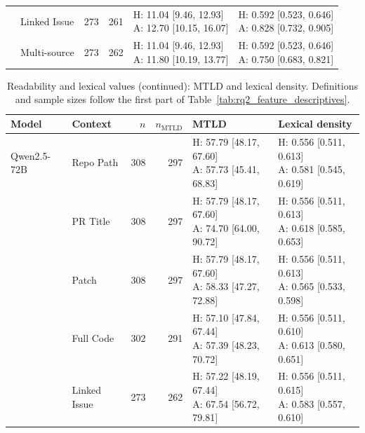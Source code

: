 \begin{table}[tbp]
\begin{tabular}{llrrll}
 & Linked Issue & 273 & 261 & \shortstack[l]{H: 11.04 [9.46, 12.93]\\A: 12.70 [10.15, 16.07]} & \shortstack[l]{H: 0.592 [0.523, 0.646]\\A: 0.828 [0.732, 0.905]} \\
 & Multi-source & 273 & 262 & \shortstack[l]{H: 11.04 [9.46, 12.93]\\A: 11.80 [10.19, 13.77]} & \shortstack[l]{H: 0.592 [0.523, 0.646]\\A: 0.750 [0.683, 0.821]} \\
\bottomrule
\end{tabular}
\end{table}

\begin{table}[tbp]
\ContinuedFloat
\caption[]{Readability and lexical values (continued): MTLD and lexical density. Definitions and sample sizes follow the first part of Table~\ref{tab:rq2_feature_descriptives}.}
\centering
\footnotesize
\setlength{\tabcolsep}{3pt}
\renewcommand{\arraystretch}{1.08}
\begin{tabular}{llrrll}
\toprule
\textbf{Model} & \textbf{Context} & \textbf{$n$} & \textbf{$n_{\mathrm{MTLD}}$} & \textbf{MTLD} & \textbf{Lexical density} \\
\midrule
Qwen2.5-72B & Repo Path & 308 & 297 & \shortstack[l]{H: 57.79 [48.17, 67.60]\\A: 57.73 [45.41, 68.83]} & \shortstack[l]{H: 0.556 [0.511, 0.613]\\A: 0.581 [0.545, 0.619]} \\
 & PR Title & 308 & 297 & \shortstack[l]{H: 57.79 [48.17, 67.60]\\A: 74.70 [64.00, 90.72]} & \shortstack[l]{H: 0.556 [0.511, 0.613]\\A: 0.618 [0.585, 0.653]} \\
 & Patch & 308 & 297 & \shortstack[l]{H: 57.79 [48.17, 67.60]\\A: 58.33 [47.27, 72.88]} & \shortstack[l]{H: 0.556 [0.511, 0.613]\\A: 0.565 [0.533, 0.598]} \\
 & Full Code & 302 & 291 & \shortstack[l]{H: 57.10 [47.84, 67.44]\\A: 57.39 [48.23, 70.72]} & \shortstack[l]{H: 0.556 [0.511, 0.610]\\A: 0.613 [0.580, 0.651]} \\
 & Linked Issue & 273 & 262 & \shortstack[l]{H: 57.22 [48.19, 67.44]\\A: 67.54 [56.72, 79.81]} & \shortstack[l]{H: 0.556 [0.511, 0.615]\\A: 0.583 [0.557, 0.610]} \\

\end{tabular}
\end{table}
